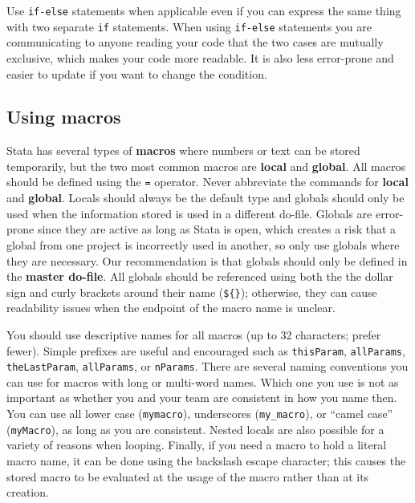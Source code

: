 
\noindent Use \texttt{if-else} statements when applicable
even if you can express the same thing with two separate \texttt{if} statements.
When using \texttt{if-else} statements you are communicating to anyone reading your code
that the two cases are mutually exclusive, which makes your code more readable.
It is also less error-prone and easier to update if you want to change the condition.


\subsection{Using macros}

Stata has several types of \textbf{macros} where numbers or text can be stored temporarily,
but the two most common macros are \textbf{local} and \textbf{global}.
All macros should be defined using the \texttt{=} operator.
Never abbreviate the commands for \textbf{local} and \textbf{global}.
Locals should always be the default type and globals should only
be used when the information stored is used in a different do-file.
Globals are error-prone since they are active as long as Stata is open,
which creates a risk that a global from one project is incorrectly used in another,
so only use globals where they are necessary.
Our recommendation is that globals should only be defined in the \textbf{master do-file}.
All globals should be referenced using both the the dollar sign and curly brackets around their name (\texttt{\$\{\}});
otherwise, they can cause readability issues when the endpoint of the macro name is unclear.

You should use descriptive names for all macros (up to 32 characters; prefer fewer).
Simple prefixes are useful and encouraged such as \texttt{thisParam}, \texttt{allParams},
\texttt{theLastParam}, \texttt{allParams}, or \texttt{nParams}.
There are several naming conventions you can use for macros with long or multi-word names.
Which one you use is not as important as whether you and your team are consistent in how you name then.
You can use all lower case (\texttt{mymacro}), underscores (\texttt{my\_macro}),
or ``camel case'' (\texttt{myMacro}), as long as you are consistent.
Nested locals are also possible for a variety of reasons when looping.
Finally, if you need a macro to hold a literal macro name,
it can be done using the backslash escape character;
this causes the stored macro to be evaluated
at the usage of the macro rather than at its creation.

